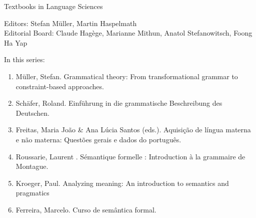 {\large Textbooks in Language Sciences}

\bigskip

Editors: Stefan Müller, Martin Haspelmath  \\
Editorial Board: Claude Hagège, Marianne Mithun, Anatol Stefanowitsch, Foong Ha Yap

\bigskip

In this series:

\begin{enumerate}
\item Müller, Stefan. Grammatical theory: From transformational grammar to constraint-based approaches.
\item Schäfer, Roland. Einführung in die grammatische Beschreibung des Deutschen.
\item Freitas, Maria João \& Ana Lúcia Santos (eds.). Aquisição de língua materna e não materna: Questões gerais e dados do português.
\item Roussarie, Laurent . Sémantique formelle : Introduction à la grammaire de Montague.
\item Kroeger, Paul. Analyzing meaning: An introduction to semantics and pragmatics
\item Ferreira, Marcelo. Curso de semântica formal.
\end{enumerate}



